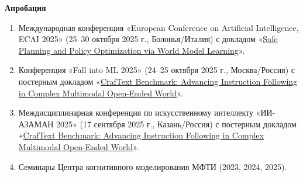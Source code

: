 \documentclass[a4paper,14pt]{extarticle}
\begin{document}
\begin{center}
{\bfseries Апробация}
\end{center}

\vspace{0.5\baselineskip}

\begin{enumerate}[leftmargin=0pt, itemindent=0pt, labelsep=0.5em, align=left, itemsep=0pt, parsep=0pt, listparindent=1.25cm]
  \item Международная конференция «European Conference on Artificial Intelligence, ECAI 2025» (25–30 октября 2025 г., Болонья/Италия) с докладом «\uline{Safe Planning and Policy Optimization via World Model Learning}».
  \item Конференция «Fall into ML 2025» (24–25 октября 2025 г., Москва/Россия) с постерным докладом «\uline{CrafText Benchmark: Advancing Instruction Following in Complex Multimodal Open-Ended World}».
  \item Междисциплинарная конференция по искусственному интеллекту «ИИ-АЗАМАН 2025» (17 сентября 2025 г., Казань/Россия) с постерным докладом «\uline{CrafText Benchmark: Advancing Instruction Following in Complex Multimodal Open-Ended World}».
  \item Семинары Центра когнитивного моделирования МФТИ (2023, 2024, 2025).
\end{enumerate}
\end{document}
